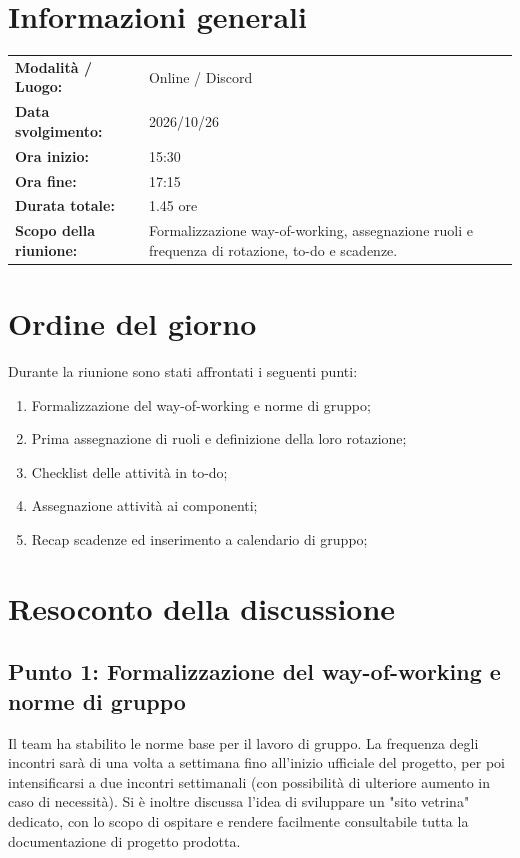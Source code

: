 \documentclass[a4paper, 11pt]{article}
\begin{document}
\newpage
\tableofcontents
\newpage


\section{Informazioni generali}
\begin{tabularx}{\textwidth}{l X}
    \textbf{Modalità / Luogo:} & Online / Discord \\
    \textbf{Data svolgimento:} & 2026/10/26 \\
    \textbf{Ora inizio:} & 15:30 \\
    \textbf{Ora fine:} & 17:15 \\
    \textbf{Durata totale:} & 1.45 ore \\
    \textbf{Scopo della riunione:} & Formalizzazione way-of-working, assegnazione ruoli e frequenza di rotazione, to-do e scadenze. \\
\end{tabularx}

\newpage


\section{Ordine del giorno}
Durante la riunione sono stati affrontati i seguenti punti:
\begin{enumerate}
    \item Formalizzazione del way-of-working e norme di gruppo;
    \item Prima assegnazione di ruoli e definizione della loro rotazione;
    \item Checklist delle attività in to-do;
    \item Assegnazione attività ai componenti;
    \item Recap scadenze ed inserimento a calendario di gruppo;
\end{enumerate}

\newpage


\section{Resoconto della discussione}

\subsection{Punto 1: Formalizzazione del way-of-working e norme di gruppo}
Il team ha stabilito le norme base per il lavoro di gruppo. La frequenza degli incontri sarà di una volta a settimana fino all'inizio ufficiale del progetto, per poi intensificarsi a due incontri settimanali (con possibilità di ulteriore aumento in caso di necessità). Si è inoltre discussa l'idea di sviluppare un "sito vetrina" dedicato, con lo scopo di ospitare e rendere facilmente consultabile tutta la documentazione di progetto prodotta.
\end{document}
